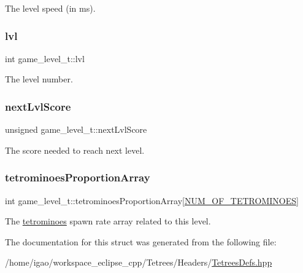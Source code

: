 The level speed (in ms). \mbox{\label{structgame__level__t_ab80383a9c51e3ad25cda4df0a7df8df2}} 
\subsubsection{\texorpdfstring{lvl}{lvl}}
{\footnotesize\ttfamily int game\+\_\+level\+\_\+t\+::lvl}

The level number. \mbox{\label{structgame__level__t_a9f5f86c9c90bebdd20950d74bf2dd450}} 
\subsubsection{\texorpdfstring{next\+Lvl\+Score}{nextLvlScore}}
{\footnotesize\ttfamily unsigned game\+\_\+level\+\_\+t\+::next\+Lvl\+Score}

The score needed to reach next level. \mbox{\label{structgame__level__t_abcef20ad8f4df7d270a4d5111ac8d85a}} 
\subsubsection{\texorpdfstring{tetrominoes\+Proportion\+Array}{tetrominoesProportionArray}}
{\footnotesize\ttfamily int game\+\_\+level\+\_\+t\+::tetrominoes\+Proportion\+Array\mbox{[}\hyperlink{TetreesDefs_8hpp_a69fa4aa1afe74f7f9ec42bf1e07ddf28}{N\+U\+M\+\_\+\+O\+F\+\_\+\+T\+E\+T\+R\+O\+M\+I\+N\+O\+ES}\mbox{]}}

The \hyperlink{TetreesDefs_8hpp_adf4f8e2cbbd7d8894fe3beda39db1b8f}{tetrominoes} spawn rate array related to this level. 

The documentation for this struct was generated from the following file\+:\begin{DoxyCompactItemize}
\item 
/home/igao/workspace\+\_\+eclipse\+\_\+cpp/\+Tetrees/\+Headers/\hyperlink{TetreesDefs_8hpp}{Tetrees\+Defs.\+hpp}\end{DoxyCompactItemize}
